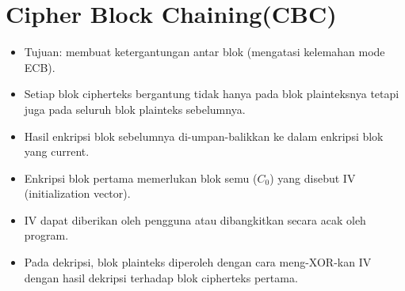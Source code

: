 \documentclass{article}
\begin{document}

\section*{Cipher Block Chaining(CBC)}

\begin{itemize}
    \item Tujuan: membuat ketergantungan antar blok (mengatasi kelemahan mode ECB).
    \item Setiap blok cipherteks bergantung tidak hanya pada blok plainteksnya tetapi juga pada seluruh blok plainteks sebelumnya.
    \item Hasil enkripsi blok sebelumnya di-umpan-balikkan ke dalam enkripsi blok yang current.
    \item Enkripsi blok pertama memerlukan blok semu ($C_0$) yang disebut IV (initialization vector).
    \item IV dapat diberikan oleh pengguna atau dibangkitkan secara acak oleh program.
    \item Pada dekripsi, blok plainteks diperoleh dengan cara meng-XOR-kan IV dengan hasil dekripsi terhadap blok cipherteks pertama.
\end{itemize}
\end{document}
